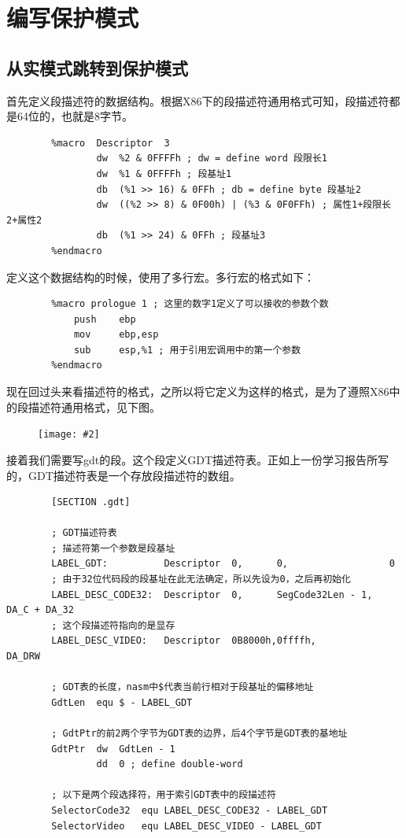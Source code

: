 \documentclass[a4paper,left=2.5cm,right=2.5cm,11pt]{article}
\newcommand{\sizedfic}[2]{\begin{figure}[H]
		\center
		\texttt{[image: \#2]}
	\end{figure}}
\begin{document}
\section{编写保护模式}
\subsection{从实模式跳转到保护模式}
	首先定义段描述符的数据结构。根据X86下的段描述符通用格式可知，段描述符都是64位的，也就是8字节。
	\begin{lstlisting}
		%macro  Descriptor  3
		        dw  %2 & 0FFFFh ; dw = define word 段限长1
		        dw  %1 & 0FFFFh ; 段基址1
		        db  (%1 >> 16) & 0FFh ; db = define byte 段基址2
		        dw  ((%2 >> 8) & 0F00h) | (%3 & 0F0FFh) ; 属性1+段限长2+属性2 
		        db  (%1 >> 24) & 0FFh ; 段基址3
		%endmacro
	\end{lstlisting}
	
	定义这个数据结构的时候，使用了多行宏。多行宏的格式如下：
	\begin{lstlisting}
		%macro prologue 1 ; 这里的数字1定义了可以接收的参数个数
			push	ebp
			mov		ebp,esp
			sub     esp,%1 ; 用于引用宏调用中的第一个参数
		%endmacro
	\end{lstlisting}
	
	现在回过头来看描述符的格式，之所以将它定义为这样的格式，是为了遵照X86中的段描述符通用格式，见下图。
	\sizedfic{0.8}{7.png}
	
	接着我们需要写gdt的段。这个段定义GDT描述符表。正如上一份学习报告所写的，GDT描述符表是一个存放段描述符的数组。
	\begin{lstlisting}
		[SECTION .gdt]
		
		; GDT描述符表
		; 描述符第一个参数是段基址
		LABEL_GDT:          Descriptor  0,      0,                  0
		; 由于32位代码段的段基址在此无法确定，所以先设为0，之后再初始化
		LABEL_DESC_CODE32:  Descriptor  0,      SegCode32Len - 1,   DA_C + DA_32
		; 这个段描述符指向的是显存
		LABEL_DESC_VIDEO:   Descriptor  0B8000h,0ffffh,             DA_DRW
		
		; GDT表的长度，nasm中$代表当前行相对于段基址的偏移地址
		GdtLen  equ $ - LABEL_GDT 
		
		; GdtPtr的前2两个字节为GDT表的边界，后4个字节是GDT表的基地址
		GdtPtr  dw  GdtLen - 1
		        dd  0 ; define double-word
		
		; 以下是两个段选择符，用于索引GDT表中的段描述符
		SelectorCode32  equ LABEL_DESC_CODE32 - LABEL_GDT
		SelectorVideo   equ LABEL_DESC_VIDEO - LABEL_GDT
	\end{lstlisting}
	
\end{document}
